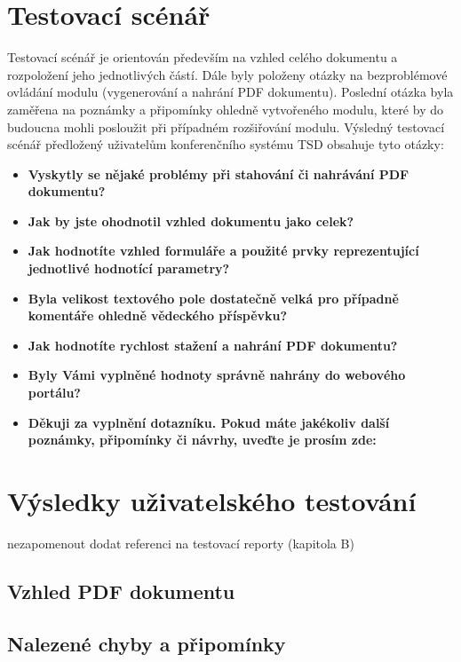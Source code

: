 \section{Testovací scénář}
Testovací scénář je orientován především na vzhled celého dokumentu a rozpoložení jeho jednotlivých částí. Dále byly položeny otázky na bezproblémové ovládání modulu (vygenerování a nahrání PDF dokumentu). Poslední otázka byla zaměřena na poznámky a připomínky ohledně vytvořeného modulu, které by do budoucna mohli posloužit při případném rozšiřování modulu.
Výsledný testovací scénář předložený uživatelům konferenčního systému TSD obsahuje tyto otázky:
\begin{itemize}
	\item \textbf{Vyskytly se nějaké problémy při stahování či nahrávání PDF dokumentu?}
	\item \textbf{Jak by jste ohodnotil vzhled dokumentu jako celek?}
	\item \textbf{Jak hodnotíte vzhled formuláře a použité prvky reprezentující jednotlivé hodnotící parametry?}
	\item \textbf{Byla velikost textového pole dostatečně velká pro případně komentáře ohledně vědeckého příspěvku?}
	\item \textbf{Jak hodnotíte rychlost stažení a nahrání PDF dokumentu?} 
	\item \textbf{Byly Vámi vyplněné hodnoty správně nahrány do webového portálu?}
	\item \textbf{Děkuji za vyplnění dotazníku. Pokud máte jakékoliv další poznámky, připomínky či návrhy, uveďte je prosím zde:}
\end{itemize}

\section{Výsledky uživatelského testování}
nezapomenout dodat referenci na testovací reporty (kapitola B)
\subsection{Vzhled PDF dokumentu}
\subsection{Nalezené chyby a připomínky}

 